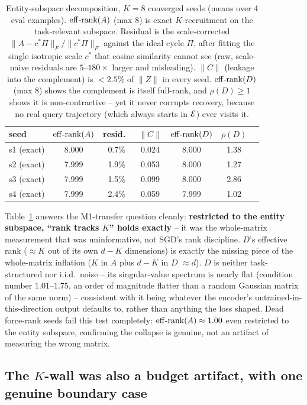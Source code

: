 \begin{table}[t]
\centering
\scriptsize
\setlength{\tabcolsep}{3pt}
\begin{tabular}{lcccccc}
\toprule
seed & $\operatorname{eff\text{-}rank}(A)$ & resid.\ & $\|C\|$ & $\operatorname{eff\text{-}rank}(D)$ & $\rho(D)$ \\
\midrule
s1 (exact) & 8.000 & 0.7\% & 0.024 & 8.000 & 1.38 \\
s2 (exact) & 7.999 & 1.9\% & 0.053 & 8.000 & 1.27 \\
s3 (exact) & 7.999 & 1.5\% & 0.099 & 8.000 & 2.86 \\
s4 (exact) & 7.999 & 2.4\% & 0.059 & 7.999 & 1.02 \\
\bottomrule
\end{tabular}
\caption{Entity-subspace decomposition, $K{=}8$ converged seeds (means over
4 eval examples). $\operatorname{eff\text{-}rank}(A)$ (max 8) is exact $K$-recruitment on the
task-relevant subspace. Residual is the scale-corrected
$\|A-c^*\Pi\|_F/\|c^*\Pi\|_F$ against the ideal cycle $\Pi$, after fitting
the single isotropic scale $c^*$ that cosine similarity cannot see (raw,
scale-naive residuals are $5$--$180\times$ larger and misleading). $\|C\|$
(leakage into the complement) is $<2.5\%$ of $\|Z\|$ in every seed.
$\operatorname{eff\text{-}rank}(D)$ (max 8) shows the complement is itself full-rank, and
$\rho(D)\geq1$ shows it is non-contractive -- yet it never corrupts
recovery, because no real query trajectory (which always starts in $\mathcal{E}$)
ever visits it.}
\label{tab:taske-subspace}
\end{table}

Table~\ref{tab:taske-subspace} answers the M1-transfer question cleanly:
\textbf{restricted to the entity subspace, ``rank tracks $K$'' holds
exactly} -- it was the whole-matrix measurement that was uninformative,
not SGD's rank discipline. $D$'s effective rank ($\approx K$ out of its own
$d{-}K$ dimensions) is exactly the missing piece of the whole-matrix
inflation ($K$ in $A$ plus $d{-}K$ in $D$ $\approx d$). $D$ is neither
task-structured nor i.i.d.\ noise -- its singular-value spectrum is nearly
flat (condition number $1.01$--$1.75$, an order of magnitude flatter than a
random Gaussian matrix of the same norm) -- consistent with it being
whatever the encoder's untrained-in-this-direction output defaults to,
rather than anything the loss shaped. Dead force-rank seeds fail this test
completely: $\operatorname{eff\text{-}rank}(A)\approx1.00$ even restricted to the entity
subspace, confirming the collapse is genuine, not an artifact of measuring
the wrong matrix.

\subsection{The $K$-wall was also a budget artifact, with one genuine
boundary case}
\label{sec:taske-kwall}

